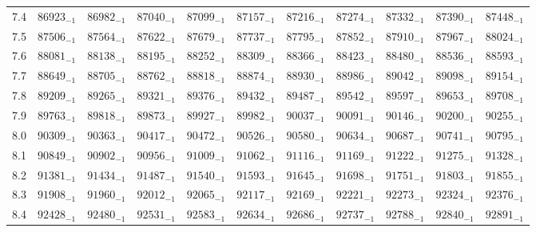 \documentclass[10pt, a4paper]{article}
\begin{document}
\begin{center}
\begin{longtable}{c || c c c c c | c c c c c}
        7.4 & \({86923}_{-1}\) & \({86982}_{-1}\) & \({87040}_{-1}\) & \({87099}_{-1}\) & \({87157}_{-1}\) & \({87216}_{-1}\) & \({87274}_{-1}\) & \({87332}_{-1}\) & \({87390}_{-1}\) & \({87448}_{-1}\)\\
        7.5 & \({87506}_{-1}\) & \({87564}_{-1}\) & \({87622}_{-1}\) & \({87679}_{-1}\) & \({87737}_{-1}\) & \({87795}_{-1}\) & \({87852}_{-1}\) & \({87910}_{-1}\) & \({87967}_{-1}\) & \({88024}_{-1}\)\\
        7.6 & \({88081}_{-1}\) & \({88138}_{-1}\) & \({88195}_{-1}\) & \({88252}_{-1}\) & \({88309}_{-1}\) & \({88366}_{-1}\) & \({88423}_{-1}\) & \({88480}_{-1}\) & \({88536}_{-1}\) & \({88593}_{-1}\)\\
        7.7 & \({88649}_{-1}\) & \({88705}_{-1}\) & \({88762}_{-1}\) & \({88818}_{-1}\) & \({88874}_{-1}\) & \({88930}_{-1}\) & \({88986}_{-1}\) & \({89042}_{-1}\) & \({89098}_{-1}\) & \({89154}_{-1}\)\\
        7.8 & \({89209}_{-1}\) & \({89265}_{-1}\) & \({89321}_{-1}\) & \({89376}_{-1}\) & \({89432}_{-1}\) & \({89487}_{-1}\) & \({89542}_{-1}\) & \({89597}_{-1}\) & \({89653}_{-1}\) & \({89708}_{-1}\)\\
        7.9 & \({89763}_{-1}\) & \({89818}_{-1}\) & \({89873}_{-1}\) & \({89927}_{-1}\) & \({89982}_{-1}\) & \({90037}_{-1}\) & \({90091}_{-1}\) & \({90146}_{-1}\) & \({90200}_{-1}\) & \({90255}_{-1}\)\\
        \hline
        8.0 & \({90309}_{-1}\) & \({90363}_{-1}\) & \({90417}_{-1}\) & \({90472}_{-1}\) & \({90526}_{-1}\) & \({90580}_{-1}\) & \({90634}_{-1}\) & \({90687}_{-1}\) & \({90741}_{-1}\) & \({90795}_{-1}\)\\
        8.1 & \({90849}_{-1}\) & \({90902}_{-1}\) & \({90956}_{-1}\) & \({91009}_{-1}\) & \({91062}_{-1}\) & \({91116}_{-1}\) & \({91169}_{-1}\) & \({91222}_{-1}\) & \({91275}_{-1}\) & \({91328}_{-1}\)\\
        8.2 & \({91381}_{-1}\) & \({91434}_{-1}\) & \({91487}_{-1}\) & \({91540}_{-1}\) & \({91593}_{-1}\) & \({91645}_{-1}\) & \({91698}_{-1}\) & \({91751}_{-1}\) & \({91803}_{-1}\) & \({91855}_{-1}\)\\
        8.3 & \({91908}_{-1}\) & \({91960}_{-1}\) & \({92012}_{-1}\) & \({92065}_{-1}\) & \({92117}_{-1}\) & \({92169}_{-1}\) & \({92221}_{-1}\) & \({92273}_{-1}\) & \({92324}_{-1}\) & \({92376}_{-1}\)\\
        8.4 & \({92428}_{-1}\) & \({92480}_{-1}\) & \({92531}_{-1}\) & \({92583}_{-1}\) & \({92634}_{-1}\) & \({92686}_{-1}\) & \({92737}_{-1}\) & \({92788}_{-1}\) & \({92840}_{-1}\) & \({92891}_{-1}\)\\

\end{longtable}
\end{center}
\end{document}
